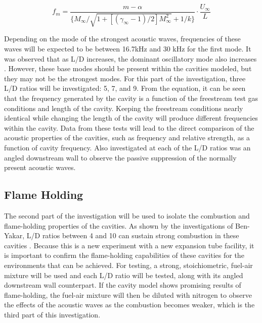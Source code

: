 \begin{equation}
f_m = \frac{m-\alpha}{\{M_{\infty}/\sqrt{1+[(\gamma_{\infty}-1)/2]M_{\infty}^2}+1/k\}} \cdot \frac{U_\infty}{L}
\label{eq:freq}
\end{equation}

Depending on the mode of the strongest acoustic waves, frequencies of these waves will be expected to be between 16.7kHz and 30 kHz for the first mode. It was observed that as L/D increases, the dominant oscillatory mode also increases \cite{ben2001cavity}. However, these base modes should be present within the cavities modeled, but they may not be the strongest modes. For this part of the investigation, three L/D ratios will be investigated: 5, 7, and 9. From the equation, it can be seen that the frequency generated by the cavity is a function of the freestream test gas conditions and length of the cavity. Keeping the freestream conditions nearly identical while changing the length of the cavity will produce different frequencies within the cavity. Data from these tests will lead to the direct comparison of the acoustic properties of the cavities, such as frequency and relative strength, as a function of cavity frequency. Also investigated at each of the L/D ratios was an angled downstream wall to observe the passive suppression of the normally present acoustic waves.


\subsection{Flame Holding}

The second part of the investigation will be used to isolate the combustion and flame-holding properties of the cavities. As shown by the investigations of Ben-Yakar, L/D ratios between 4 and 10 can sustain strong combustion in these cavities \cite{ben2001cavity}. Because this is a new experiment with a new expansion tube facility, it is important to confirm the flame-holding capabilities of these cavities for the environments that can be achieved. For testing, a strong, stoichiometric, fuel-air mixture will be used and each L/D ratio will be tested, along with its angled downstream wall counterpart. If the cavity model shows promising results of flame-holding, the fuel-air mixture will then be diluted with nitrogen to observe the effects of the acoustic waves as the combustion becomes weaker, which is the third part of this investigation. 

